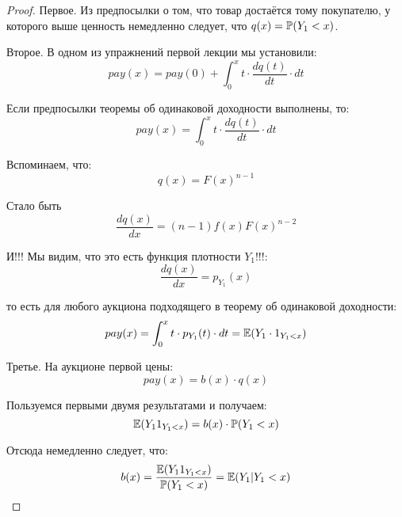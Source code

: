 \begin{proof}

Первое. Из предпосылки о том, что товар достаётся тому покупателю, у которого выше ценность немедленно следует, что $ q(x)=\P(Y_{1}<x) $.

Второе. В одном из упражнений первой лекции мы установили:
\begin{equation}
pay(x)=pay(0)+\int_{0}^{x}t \cdot \frac{dq(t)}{dt}\cdot dt
\end{equation}

Если предпосылки теоремы об одинаковой доходности выполнены, то:
\begin{equation}
pay(x)=\int_{0}^{x}t \cdot \frac{dq(t)}{dt}\cdot dt
\end{equation}


Вспоминаем, что:
\begin{equation}
q(x)=F(x)^{n-1}
\end{equation}

Стало быть
\begin{equation}
\frac{dq(x)}{dx}=(n-1)f(x)F(x)^{n-2}
\end{equation}

И!!! Мы видим, что это есть функция плотности $ Y_{1} $!!!:
\begin{equation}
\frac{dq(x)}{dx}=p_{Y_{1}}(x)
\end{equation}

то есть для любого аукциона подходящего в теорему об одинаковой доходности:
\begin{equation}
pay(x)=\int_{0}^{x}t \cdot p_{Y_{1}}(t)\cdot dt=\E(Y_{1}\cdot 1_{Y_{1}<x})
\end{equation}



Третье. На аукционе первой цены:
\begin{equation}
pay(x)=b(x)\cdot q(x)
\end{equation}

Пользуемся первыми двумя результатами и получаем:
\begin{equation}
\E(Y_{1}1_{Y_{1}<x})=b(x)\cdot \P(Y_{1}<x)
\end{equation}

Отсюда немедленно следует, что:
\begin{equation}
b(x)=\frac{\E(Y_{1}1_{Y_{1}<x})}{\P(Y_{1}<x)}=\E(Y_{1}|Y_{1}<x)
\end{equation}



\end{proof}







